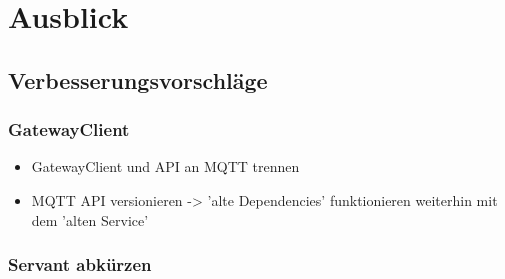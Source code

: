 \chapter{Ausblick}
\section{Verbesserungsvorschläge}
\subsection{GatewayClient}
\begin{itemize}
	\item
	GatewayClient und API an MQTT trennen
	
	\item
	MQTT API versionieren -> 'alte Dependencies' funktionieren weiterhin mit dem 'alten Service'
\end{itemize}

\subsection{Servant abkürzen}
